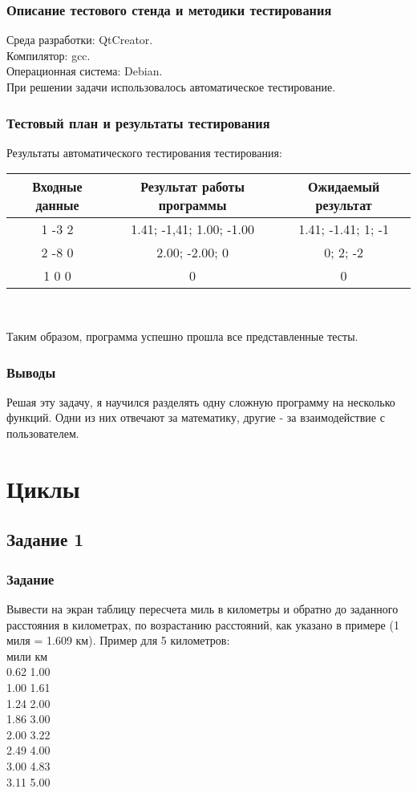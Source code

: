 \documentclass[12pt,a4paper]{report}
\begin{document}
\subsection{Описание тестового стенда и методики тестирования}
Среда разработки: QtCreator.\\
Компилятор: gcc. \\
Операционная система: Debian. \\
При решении задачи использовалось автоматическое тестирование.\\
\subsection{Тестовый план и результаты тестирования}
\begin{center}
Результаты автоматического тестирования тестирования:
\end{center}
\begin{tabular}{|c|c|c|} 
\hline
Входные данные & Результат работы программы & Ожидаемый результат \\
\hline
1 -3 2 & 1.41; -1,41; 1.00; -1.00 & 1.41; -1.41; 1; -1 \\
\hline
2 -8 0 & 2.00; -2.00; 0 & 0; 2; -2 \\
\hline 
1 0 0 & 0 & 0 \\
\hline
\end{tabular} 
\\
\begin{center}
Таким образом, программа успешно прошла все представленные тесты. 
\end{center}

\subsection{Выводы}
Решая эту задачу, я научился разделять одну сложную программу на несколько функций. Одни из них отвечают за математику, другие - за взаимодействие с пользователем. 
\chapter{Циклы}
\section{Задание 1}
\subsection{Задание}
Вывести на экран таблицу пересчета миль в километры и обратно до заданного расстояния в километрах, по возрастанию расстояний, как указано в примере (1 миля = 1.609 км). Пример для 5 километров: \\
мили  км \\
0.62 1.00 \\
1.00 1.61 \\
1.24 2.00 \\
1.86 3.00 \\
2.00 3.22 \\
2.49 4.00 \\
3.00 4.83 \\
3.11 5.00 \\
\end{document}

